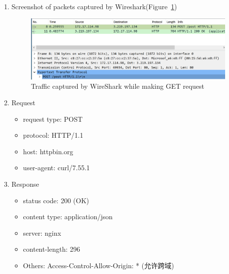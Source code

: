 \documentclass[12pt,letterpaper]{ctexart}
\begin{document}
\begin{enumerate}
\begin{enumerate}
    \newpage
    \item Screenshot of packets captured by Wireshark(Figure~\ref{fig:post_ws})
      \begin{figure}[H]
        \centering
        \includegraphics[width=0.8\linewidth]{assets/post_wireshark.png}
        \caption{Traffic captured by WireShark while making GET request}
        \label{fig:post_ws}
      \end{figure}
    \item Request
      \begin{itemize}
        \item request type: POST
        \item protocol: HTTP/1.1
        \item host: httpbin.org
        \item user-agent: curl/7.55.1
      \end{itemize}
    \item Response
      \begin{itemize}
        \item status code: 200 (OK)
        \item content type: application/json
        \item server: nginx
        \item content-length: 296
        \item Others: Access-Control-Allow-Origin: * (允许跨域)
      \end{itemize}

  \end{enumerate}
\end{enumerate}
\end{document}
